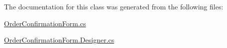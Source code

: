 The documentation for this class was generated from the following files\+:\begin{DoxyCompactItemize}
\item 
\hyperlink{_order_confirmation_form_8cs}{Order\+Confirmation\+Form.\+cs}\item 
\hyperlink{_order_confirmation_form_8_designer_8cs}{Order\+Confirmation\+Form.\+Designer.\+cs}\end{DoxyCompactItemize}

